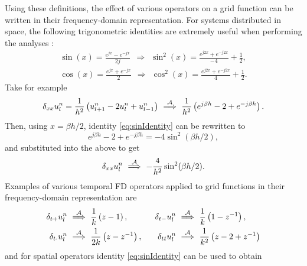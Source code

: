 {{%
Using these definitions, the effect of various operators on a grid function can be written in their frequency-domain representation. For systems distributed in space, the following trigonometric identities are extremely useful when performing the analyses \cite[p. 71]{Abramowitz1972}:
\begin{subequations}\label{eq:trigIdentities}
    \begin{gather}
        \sin(x) = \frac{e^{jx} - e^{-jx}}{2j}\ \ \Rightarrow \ \ \sin^2(x) %
        = \frac{e^{j2x} + e^{-j2x}}{-4} + \frac{1}{2},\label{eq:sinIdentity}\\
        \cos(x) = \frac{e^{jx} + e^{-jx}}{2}\ \ \Rightarrow \ \ \cos^2(x) %
        = \frac{e^{j2x} + e^{-j2x}}{4} + \frac{1}{2}.\label{eq:cosIdentity}
    \end{gather}
\end{subequations}
Take for example
\begin{equation*}
    \delta_{xx} u_l^n = \frac{1}{h^2}\left(u_{l+1}^n - 2 u_l^n + u_{l-1}^n\right)\ \overset{\mathcal{A}}{\Longrightarrow}\  \frac{1}{h^2}\left(e^{j\beta h} - 2 + e^{-j\beta h}\right).
\end{equation*}
Then, using $x = \beta h / 2$, identity \eqref{eq:sinIdentity} can be rewritten to 
\begin{equation*}
    e^{j\beta h} - 2 + e^{-j\beta h} = -4 \sin^2(\beta h / 2),
\end{equation*}
and substituted into the above to get
\begin{equation*}
    \delta_{xx} u_l^n \ \overset{\mathcal{A}}{\Longrightarrow}\  -\frac{4}{h^2}\sin^2(\beta h /2).
\end{equation*}
Examples of various temporal FD operators applied to grid functions in their frequency-domain representation are
\begin{equation}\label{eq:temporalAnsatz}
    \begin{aligned}
    \delta_{t+} u_l^n &\ \overset{\mathcal{A}}{\Longrightarrow}\  \frac{1}{k} \left(z - 1\right),& \delta_{t-} u_l^n &\ \overset{\mathcal{A}}{\Longrightarrow}\  \frac{1}{k} \left(1 - z^{-1}\right),\\
    \delta_{t\cdot} u_l^n&\ \overset{\mathcal{A}}{\Longrightarrow}\  \dfrac{1}{2k} \left(z - z^{-1}\right), &\quad \delta_{tt} u_l^n&\ \overset{\mathcal{A}}{\Longrightarrow}\ \frac{1}{k^2} \left(z - 2 + z^{-1}\right)
    \end{aligned}
\end{equation}
and for spatial operators identity \eqref{eq:sinIdentity} can be used to obtain
}}
